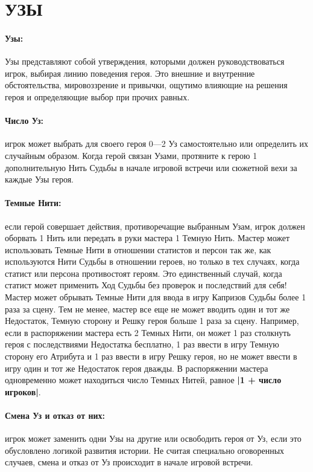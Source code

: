 \section{УЗЫ}
\paragraph{Узы:} Узы представляют собой утверждения, которыми должен руководствоваться игрок, выбирая линию поведения героя. Это внешние и внутренние обстоятельства, мировоззрение и привычки, ощутимо влияющие на решения героя и определяющие выбор при прочих равных.
\paragraph{Число Уз:} игрок может выбрать для своего героя 0—2 Уз самостоятельно или определить их случайным образом. Когда герой связан Узами, протяните к герою 1 дополнительную Нить Судьбы в начале игровой встречи или сюжетной вехи за каждые Узы героя.
\paragraph{Темные Нити:} если герой совершает действия, противоречащие выбранным Узам, игрок должен оборвать 1 Нить или передать в руки мастера 1 Темную Нить.
\newline
Мастер может использовать Темные Нити в отношении статистов и персон так же, как используются Нити Судьбы в отношении героев, но только в тех случаях, когда статист или персона противостоят героям. Это единственный случай, когда статист может применить Ход Судьбы без проверок и последствий для себя!
\newline
Мастер может обрывать Темные Нити для ввода в игру Капризов Судьбы более 1 раза за сцену. Тем не менее, мастер все еще не может вводить один и тот же Недостаток, Темную сторону и Решку героя больше 1 раза за сцену. Например, если в распоряжении мастера есть 2 Темных Нити, он может 1 раз столкнуть героя с последствиями Недостатка бесплатно, 1 раз ввести в игру Темную сторону его Атрибута и 1 раз ввести в игру Решку героя, но не может ввести в игру один и тот же Недостаток героя дважды. В распоряжении мастера одновременно может находиться число Темных Нитей, равное \textbf{|1 + число игроков|}.
\paragraph{Смена Уз и отказ от них:} игрок может заменить одни Узы на другие или освободить героя от Уз, если это обусловлено логикой развития истории. Не считая специально оговоренных случаев, смена и отказ от Уз происходит в начале игровой встречи.
